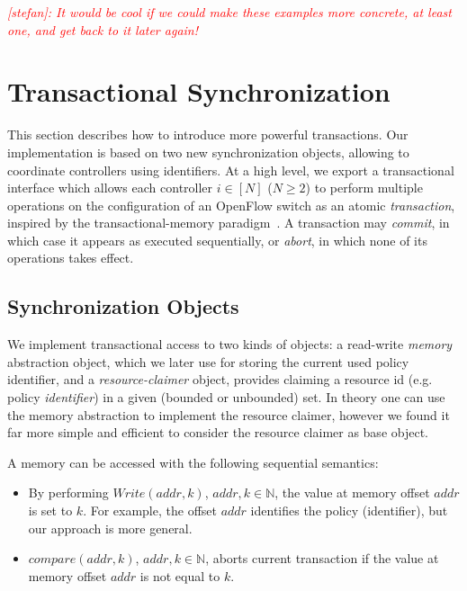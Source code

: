 \documentclass[conference]{sigcomm-alternate}
\newcommand{\Nat}{\mathbb{N}}
\newcommand{\compare}{compare\xspace}
\newcommand{\stefan}[1]{\textit{\textcolor{red}{[stefan]: #1}}} %
\begin{document}
\stefan{It would be cool if we could make these examples more concrete,
at least one, and get back to it later again!}

\section{Transactional Synchronization}\label{sec:main}

This section describes how to introduce more powerful transactions.
Our implementation is based on two new synchronization objects,
allowing to coordinate controllers using identifiers.
At a high level, we export a
transactional interface which allows each controller $i\in[N]$ ($N\geq
2$) to perform multiple
operations on the configuration of an OpenFlow switch as an atomic
\emph{transaction}, inspired by the transactional-memory paradigm~\cite{stm-st95,tm-book}. A transaction may \emph{commit}, in
which case it appears as executed sequentially, or \emph{abort}, in
which none of its operations takes effect.

\subsection{Synchronization Objects}\label{sec:t-if}

We implement transactional access to  two kinds of objects: a read-write \emph{memory} abstraction
object, which we later use for storing the current used policy identifier, and a
\emph{resource-claimer} object, provides claiming a resource id (e.g. policy \emph{identifier}) in a
given (bounded or unbounded) set.
In theory one can use the memory abstraction to implement the resource claimer, 
however we found it far more simple and efficient to consider the resource claimer as base object.
%


A memory can be accessed with the following sequential
semantics:

\begin{itemize}
\item By performing $\textit{Write}(addr,k)$,
  $addr,k\in\Nat$, the value at memory offset $addr$ is set to $k$. For
  example, the offset $addr$ identifies the policy (identifier), 
  but our approach is more general.

\item $\textit{\compare}(addr,k)$, $addr,k\in\Nat$,
aborts current transaction if the value at memory offset $addr$ is not equal to $k$.

\end{itemize}
\end{document}
